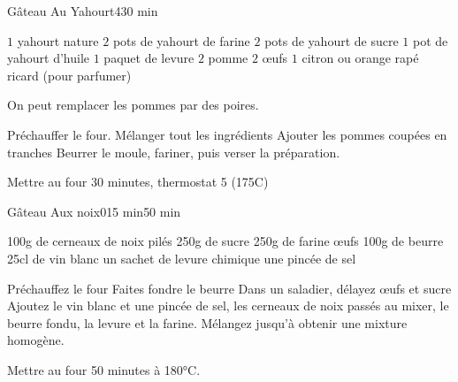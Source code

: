 \begin{recette}{Gâteau Au Yahourt}{4}{}{30 min}

\begin{ingredients}
\ingredient $1$ yahourt nature
\ingredient $2$ pots de yahourt de farine
\ingredient $2$ pots de yahourt de sucre
\ingredient $1$ pot de yahourt d'huile
\ingredient $1$ paquet de levure
\ingredient $2$ pomme
\ingredient $2$ œufs
\ingredient $1$ citron ou orange rapé
\ingredient ricard (pour parfumer)
\end{ingredients}

\begin{remarque}
On peut remplacer les pommes par des poires.
\end{remarque}

\begin{preparation}
\etape Préchauffer le four.
\etape Mélanger tout les ingrédients
\etape Ajouter les pommes coupées en tranches
\etape Beurrer le moule, fariner, puis verser la préparation.
\end{preparation}

\begin{cuisson}
Mettre au four 30 minutes, thermostat 5 (175\degres C)
\end{cuisson}
\end{recette}

\begin{recette}{Gâteau Aux noix}{0}{15 min}{50 min}

\begin{ingredients}
\ingredient 100g de cerneaux de noix pilés
\ingredient 250g de sucre
\ingredient 250g de farine
 œufs
\ingredient 100g de beurre
\ingredient 25cl de vin blanc
\ingredient un sachet de levure chimique
\ingredient une pincée de sel
\end{ingredients}

\begin{preparation}
\etape Préchauffez le four
\etape Faites fondre le beurre
\etape Dans un saladier, délayez œufs et sucre
\etape Ajoutez le vin blanc et une pincée de sel, les cerneaux de noix passés au mixer, le beurre fondu, la levure et la farine. 
\etape Mélangez jusqu'à obtenir une mixture homogène. 
\end{preparation}

\begin{cuisson}
Mettre au four 50 minutes à 180°C.
\end{cuisson}
\end{recette}

